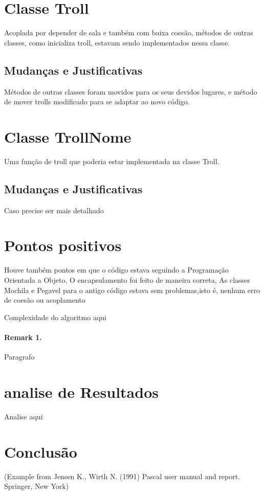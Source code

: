 \documentclass[runningheads,a4paper]{llncs}
\begin{document}
\section{Classe Troll}

Acoplada por depender de sala e também com baixa coesão, métodos de outras classes, como inicializa troll, estavam sendo implementados nessa classe.

\subsection{Mudanças e Justificativas}

Métodos de outras classes foram movidos para os seus devidos lugares, e método de mover trolls modificado para se adaptar ao novo código.

\section{Classe TrollNome}

Uma função de troll que poderia estar implementada na classe Troll. 

\subsection{Mudanças e Justificativas}


Caso precise ser mais detalhado

\section{Pontos positivos}

Houve também pontos em que o código estava seguindo a Programação Orientada a Objeto. O encapsulamento foi feito de maneira correta, As classes Mochila e Pegavel para o antigo código estava sem problemas,isto é, nenhum erro de coesão ou acoplamento 

Complexidade do algoritmo aqui




\paragraph{Remark 1.}
Paragrafo


\section{analise de Resultados}
Analise aqui

\section{Conclusão}

{\small (Example from Jensen K., Wirth N. (1991) Pascal user manual and
report. Springer, New York)}


\nocite{*} 
\end{document}
